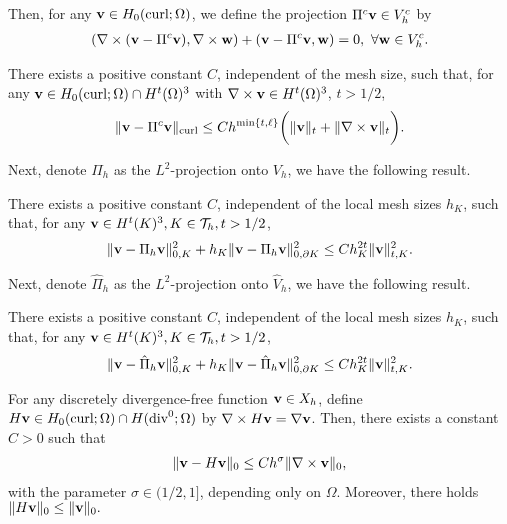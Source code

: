 \documentclass[final,leqno]{siamltex704}
\newcommand{\bv}{{\bf v}}
\def\bv{{\bf v}}
\def\bw{{\bf w}}
\begin{document}
Then, for any $\bv\in H_0(\text{curl};\Omega)$, we define the projection $\Pi^c\bv\in V_h^c$ by
\begin{eqnarray}
(\nabla\times(\bv-\Pi^c\bv),\nabla\times\bw)+(\bv-\Pi^c\bv,\bw)=0,\ \forall\bw\in V_h^c.
\end{eqnarray}

\begin{lemma}
There exists a positive constant $C$, independent of the mesh size, such that, for any $\bv\in H_0(\text{curl};\Omega)\cap H^t(\Omega)^3$ with $\nabla\times\bv\in H^t(\Omega)^3$, $t>1/2$,
\begin{eqnarray}
\|\bv-\Pi^c\bv\|_\text{curl}\le Ch^{\min\{t,\ell\}}\bigg(\|\bv\|_t+\|\nabla\times\bv\|_t\bigg).
\end{eqnarray}
\end{lemma}

Next, denote $\Pi_h$ as the $L^2$-projection onto $V_h$, we have the following result.
\begin{lemma}
There exists a positive constant $C$, independent of the local mesh sizes $h_K$, such that, for any $\bv\in H^t(K)^3, K\in\mathcal{T}_h, t>1/2$,
\begin{eqnarray}
\|\bv-\Pi_h\bv\|_{0,K}^2+h_K\|\bv-\Pi_h\bv\|_{0,\partial K}^2\le Ch_K^{2t}\|\bv\|_{t,K}^2.
\end{eqnarray}
\end{lemma}

{\color{red}
Next, denote $\hat{\Pi}_h$ as the $L^2$-projection onto $\hat{V}_h$, we have the following result.
\begin{lemma}
There exists a positive constant $C$, independent of the local mesh sizes $h_K$, such that, for any $\bv\in H^t(K)^3, K\in\mathcal{T}_h, t>1/2$,
\begin{eqnarray}
\|\bv-\hat{\Pi}_h\bv\|_{0,K}^2+h_K\|\bv-\hat{\Pi}_h\bv\|_{0,\partial K}^2\le Ch_K^{2t}\|\bv\|_{t,K}^2.
\end{eqnarray}
\end{lemma}
}

\begin{lemma}
For any discretely divergence-free function $\bv\in X_h$, define $H\bv\in H_0(\text{curl};\Omega)\cap H(\text{div}^0;\Omega)$ by $\nabla\times H\bv=\nabla\bv$. Then, there exists a constant $C>0$ such that
\begin{eqnarray}
\|\bv-H\bv\|_0\le Ch^{\sigma}\|\nabla\times\bv\|_0,
\end{eqnarray}
with the parameter $\sigma\in (1/2,1]$, depending only on $\Omega$. Moreover, there holds $\|H\bv\|_0\le \|\bv\|_0.$
\end{lemma}
\end{document}
